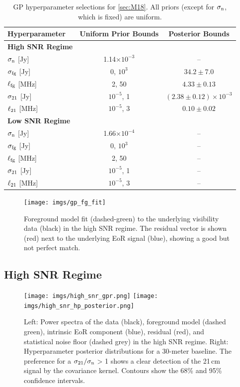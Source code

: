 \documentclass[a4paper,fleqn,usenatbib]{mnras}
\def\sigman{\sigma_{\rm n}}
\def\sigmato{\sigma_{\rm 21}}
\begin{document}
\begin{table}
\centering
\begin{tabular}{l c c} 
 \hline
 \hline
 Hyperparameter & Uniform Prior Bounds & Posterior Bounds \\
 \hline
 {\bfseries High SNR Regime} \\
 $\sigma_{\rm n}$ [Jy] & 1.14$\times10^{-3}$ & -- \\[.1em]
 $\sigma_{\rm fg}$ [Jy] & 0, $10^3$ & $34.2 \pm 7.0$  \\
 $\ell_{\rm fg}$ [MHz] & 2, 50 & $4.33 \pm 0.13$ \\
 $\sigma_{\rm 21}$ [Jy] & $10^{-5}$, 1 & $(2.38\pm0.12)\times10^{-3}$ \\
 $\ell_{\rm 21}$ [MHz] & $10^{-5}$, 3 & $0.10 \pm 0.02$ \\
  \hline
{\bfseries Low SNR Regime} \\
 $\sigma_{\rm n}$ [Jy] & 1.66$\times10^{-4}$ & -- \\
 $\sigma_{\rm fg}$ [Jy] & 0, $10^3$ & --\\
 $\ell_{\rm fg}$ [MHz] & 2, 50 & --\\
 $\sigma_{\rm 21}$ [Jy] & $10^{-5}$, 1 & --\\
 $\ell_{\rm 21}$ [MHz] & $10^{-5}$, 3 & --\\
 \hline
 \hline
\end{tabular}
\caption{GP hyperparameter selections for \autoref{sec:M18}. All priors (except for $\sigman$, which is fixed) are uniform.}
\label{tab:hp_priors}
\end{table}


\begin{figure}
\centering
\texttt{[image: imgs/gp\_fg\_fit]}
\caption{Foreground model fit (dashed-green) to the underlying visibility data (black) in the high SNR regime. The residual vector is shown (red) next to the underlying EoR signal (blue), showing a good but not perfect match.}
\label{fig:gp_fg_fit}
\end{figure}


\subsection{High SNR Regime}
\label{sec:high_snr}

\begin{figure}
\centering
\texttt{[image: imgs/high\_snr\_gpr.png]}
\texttt{[image: imgs/high\_snr\_hp\_posterior.png]}
\caption{Left: Power spectra of the data (black), foreground model (dashed green), intrinsic EoR component (blue), residual (red), and statistical noise floor (dashed grey) in the high SNR regime. Right: Hyperparameter posterior distributions for a 30-meter baseline. The preference for a $\sigmato/\sigman$ > 1 shows a clear detection of the 21\,cm signal by the covariance kernel. Contours show the 68\% and 95\% confidence intervals.}
\label{fig:high_snr}
\end{figure}
\end{document}
